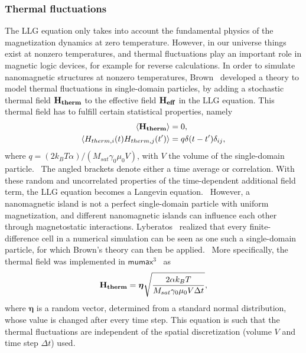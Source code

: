 \documentclass[11pt,a4paper,english]{article}
\renewcommand{\vec}[1]{\boldsymbol{#1}}
\newcommand{\mumax}{$\mathsf{mumax}^3$}
\begin{document}
\subsubsection{Thermal fluctuations}
The LLG equation only takes into account the fundamental physics of the magnetization dynamics at zero temperature. However, in our universe things exist at nonzero temperatures, and thermal fluctuations play an important role in magnetic logic devices, for example for reverse calculations. In order to simulate nanomagnetic structures at nonzero temperatures, Brown~\cite{ThermFluc_SingleDomain} developed a theory to model thermal fluctuations in single-domain particles, by adding a stochastic thermal field $\vb{H_{therm}}$ to the effective field $\vb{H_{eff}}$ in the LLG equation. This thermal field has to fulfill certain statistical properties, namely
\begin{align*}
    \langle \vb{H_{therm}} \rangle &= 0 \mathrm{,} \\
    \langle H_{therm,i}(t) H_{therm,j}(t') \rangle &= q \delta(t-t') \delta_{ij} \mathrm{,}
\end{align*}
where $q=(2 k_B T \alpha)/(M_{sat} \gamma_0 \mu_0 V)$, with $V$ the volume of the single-domain particle.~\cite{phd_leliaert} The angled brackets denote either a time average or correlation. With these random and uncorrelated properties of the time-dependent additional field term, the LLG equation becomes a Langevin equation.~\cite{ThermFluc_SingleDomain} However, a nanomagnetic island is not a perfect single-domain particle with uniform magnetization, and different nanomagnetic islands can influence each other through magnetostatic interactions.
Lyberatos~\cite{Lyberatos_1993} realized that every finite-difference cell in a numerical simulation can be seen as one such a single-domain particle, for which Brown's theory can then be applied.~\cite{phd_leliaert} More specifically, the thermal field was implemented in \mumax{}~\cite{LEL-17b,MuMax3} as
\begin{equation}
    \vb{H_{therm}} = \vec{\eta} \sqrt{\frac{2 \alpha k_B T}{M_{sat} \gamma_0 \mu_0 V \Delta t}} \mathrm{,}
    \label{eq:H_therm}
\end{equation}
where $\vec{\eta}$ is a random vector, determined from a standard normal distribution, whose value is changed after every time step. This equation is such that the thermal fluctuations are independent of the spatial discretization (volume $V$ and time step $\Delta t$) used.
\end{document}
